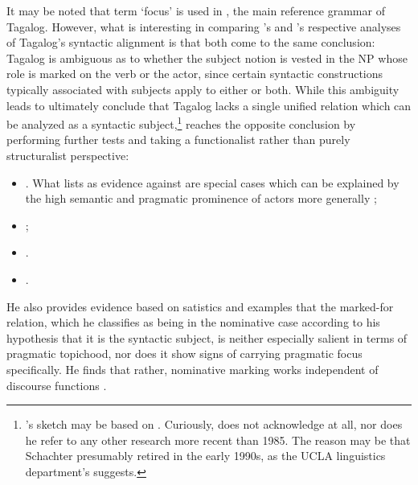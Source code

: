 It may be noted that term `focus' is used in \citet{schachterotanes1972}, the
main reference grammar of Tagalog. However, what is interesting in comparing
\citet{schachter2015}'s and \citet{kroeger1991}'s respective analyses of
Tagalog's syntactic alignment is that both come to the same conclusion: Tagalog
is ambiguous as to whether the subject notion is vested in the NP whose role is
marked on the verb or the actor, since certain syntactic constructions
typically associated with subjects apply to either or both. While this
ambiguity leads \textcites{schachter1976}{schachter2015} to ultimately conclude
that Tagalog lacks a single unified relation which can be analyzed as a
syntactic subject,\footnote{\citet{cowan1995}'s sketch may be based on
\citet{schachter1976}. Curiously, \citet{schachter2015} does not acknowledge
\citet{kroeger1991} at all, nor does he refer to any other research more recent
than 1985. The reason may be that Schachter presumably retired in the early
1990s, as the UCLA linguistics department's \citet{uclalingdepthist} suggests.}
\citet{kroeger1991} reaches the opposite conclusion by performing further tests
and taking a functionalist rather than purely structuralist perspective:

\begin{itemize}
	\item {}. What
		\citet{schachter1976} lists as evidence against are special cases which
		can be explained by the high semantic and pragmatic prominence of
		actors more generally \citep[225]{kroeger1991};
	\item {};
	\item {}.
	\item {}.
\end{itemize}

He also provides evidence based on satistics and examples that the marked-for
relation, which he classifies as being in the nominative case according to his
hypothesis that it is the syntactic subject, is neither especially salient in
terms of pragmatic topichood, nor does it show signs of carrying pragmatic
focus specifically. He finds that rather, nominative marking works independent
of discourse functions \citep[56\psqq]{kroeger1991}.

